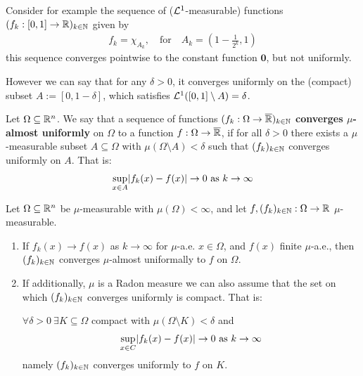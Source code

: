Consider for example the sequence of ($\mathcal{L}^{1}$-measurable) functions $(f_k: [0,1] \to \mathbb{R})_{k \in \mathbb{N}}$ given by
\begin{align*}
  f_k = \chi_{A_k}, \quad \text{for} \quad A_{k} = \left(1 - \frac{1}{2^{k}},1\right)
\end{align*}
this sequence converges pointwise to the constant function $\bm{0}$, but not uniformly.

However we can say that for any $\delta > 0$, it converges uniformly on the (compact) subset $A := [0,1 - \delta]$, which satisfies $\mathcal{L}^{1}([0,1] \setminus A) = \delta$.


\begin{dfn}[]
  Let $\Omega \subseteq \mathbb{R}^{n}$.
  We say that a sequence of functions $(f_k: \Omega \to \overline{\mathbb{R}})_{k \in \mathbb{N}}$ \textbf{converges $\mu$-almost uniformly} on $\Omega$ to a function $f: \Omega \to \overline{\mathbb{R}}$,
if for all $\delta > 0$ there exists a $\mu$-measurable subset $A \subseteq \Omega$ with $\mu(\Omega \setminus A) < \delta$ such that $(f_k)_{k \in \mathbb{N}}$ converges uniformly on $A$.
That is:
\begin{align*}
  \sup_{x \in A} \abs{f_k(x) - f(x)} \to  0 \text{ as } k \to  \infty
\end{align*}
\end{dfn}


\begin{thm}[Egoroff]
  Let $\Omega \subseteq \mathbb{R}^{n}$ be $\mu$-measurable with $\mu(\Omega) < \infty$,
  and let
  $f,(f_k)_{k \in \mathbb{N}}: \Omega \to \mathbb{R}$ $\mu$-measurable.
  \begin{enumerate}
    \item 
      If $f_k(x) \to  f(x)$ as $k \to  \infty$ for $\mu$-a.e. $x \in \Omega$, and $f(x)$ finite $\mu$-a.e., 
      then $(f_k)_{k \in \mathbb{N}}$ converges $\mu$-almost uniformally to $f$ on $\Omega$.
    \item 
      If additionally, $\mu$ is a Radon measure we can also assume that the set on which $(f_k)_{k \in \mathbb{N}}$ converges uniformly is compact.
      That is:

      $\forall \delta > 0\ \exists K \subseteq \Omega$ compact with $\mu(\Omega \setminus K) < \delta$ and
      \begin{align*}
        \sup_{x \in C} \abs{f_k(x) - f(x)} \to 0 \text{ as } k \to  \infty
      \end{align*}
      namely $(f_k)_{k \in \mathbb{N}}$ converges uniformly to $f$ on $K$.
  \end{enumerate}
\end{thm}

